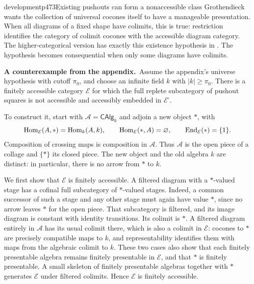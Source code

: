 
\begin{dcomment}{development}{p473}{Existing pushouts can form a nonaccessible class}
Grothendieck wants the collection of universal cocones itself to have a manageable presentation. When all diagrams of a fixed shape have colimits, this is true: restriction identifies the category of colimit cocones with the accessible diagram category. The higher-categorical version has exactly this existence hypothesis in \citet[Example~5.4.7.9]{Lurie2009HTT}. The hypothesis becomes consequential when only some diagrams have colimits.

\textbf{A counterexample from the appendix.}\ours\
Assume the appendix's universe hypothesis with cutoff $\pi_0$, and choose an infinite field $k$ with $|k|\ge\pi_0$. There is a finitely accessible category $\mathcal E$ for which the full replete subcategory of pushout squares is not accessible and accessibly embedded in $\mathcal E^\square$.

To construct it, start with $\mathcal A=\mathsf{CAlg}_k$ and adjoin a new object $*$, with
\[
 \operatorname{Hom}_{\mathcal E}(A,*)=\operatorname{Hom}_k(A,k),\qquad
 \operatorname{Hom}_{\mathcal E}(*,A)=\varnothing,\qquad
 \operatorname{End}_{\mathcal E}(*)=\{1\}.
\]
Composition of crossing maps is composition in $\mathcal A$. Thus $\mathcal A$ is the open piece of a collage and $\{*\}$ its closed piece. The new object and the old algebra $k$ are distinct: in particular, there is no arrow from $*$ to $k$.

We first show that $\mathcal E$ is finitely accessible. A filtered diagram with a $*$-valued stage has a cofinal full subcategory of $*$-valued stages. Indeed, a common successor of such a stage and any other stage must again have value $*$, since no arrow leaves $*$ for the open piece. That subcategory is filtered, and its image diagram is constant with identity transitions. Its colimit is $*$. A filtered diagram entirely in $\mathcal A$ has its usual colimit there, which is also a colimit in $\mathcal E$: cocones to $*$ are precisely compatible maps to $k$, and representability identifies them with maps from the algebraic colimit to $k$. These two cases also show that each finitely presentable algebra remains finitely presentable in $\mathcal E$, and that $*$ is finitely presentable. A small skeleton of finitely presentable algebras together with $*$ generates $\mathcal E$ under filtered colimits. Hence $\mathcal E$ is finitely accessible.


\end{dcomment}
